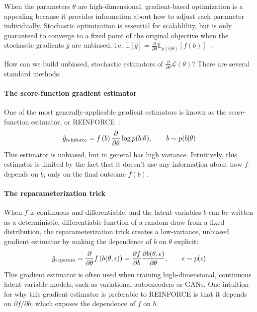 \documentclass{article}
\newcommand{\PT}{\frac{\partial}{\partial \theta}}
\begin{document}
When the parameters $\theta$ are high-dimensional, gradient-based optimization is a appealing because it provides information about how to adjust each parameter individually.
Stochastic optimization is essential for scalablility, but is only guaranteed to converge to a fixed point of the original objective when the stochastic gradients $\hat g$ are unbiased, i.e. ${\mathbb{E} \left[ \hat g \right] = \PT \mathbb{E}_{p(b|\theta)} \left[ f(b) \right]}$~\citep{robbins1951stochastic}.

How can we build unbiased, stochastic estimators of $\PT \mathcal{L}(\theta)$?
There are several standard methods:

\paragraph{The score-function gradient estimator}
One of the most generally-applicable gradient estimators is known as the score-function estimator, or REINFORCE~\citep{williams1992simple}:
%
\begin{align}
\hat g_\textnormal{reinforce} =  f \left( b \right) \PT \log p(b | \theta), \qquad b \sim p(b | \theta)
\end{align}
%
This estimator is unbiased, but in general has high variance.
Intuitively, this estimator is limited by the fact that it doesn't use any information about how $f$ depends on $b$, only on the final outcome $f(b)$.

\paragraph{The reparameterization trick}
When $f$ is continuous and differentiable, and the latent variables $b$ can be written as a deterministic, differentiable function of a random draw from a fixed distribution, the reparameterization trick \citep{williams1992simple, kingma2013autoencoding, rezende2014stochastic} creates a low-variance, unbiased gradient estimator by making the dependence of $b$ on $\theta$ explicit:
%
\begin{align}
\hat g_\textnormal{reparam}
= \PT f \left( b(\theta, \epsilon) \right)
= \frac{\partial f}{\partial b} \frac{\partial b(\theta, \epsilon)}{\partial \theta}, 
\qquad \epsilon \sim p(\epsilon) 
\end{align}
%
This gradient estimator is often used when training high-dimensional, continuous latent-variable models, such as variational autoencoders or GANs.
One intuition for why this gradient estimator is preferable to REINFORCE is that it depends on $\partial f / \partial b$, which exposes the dependence of $f$ on $b$.
\end{document}
